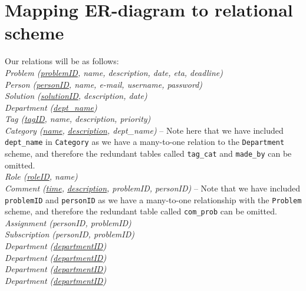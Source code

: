 \section{Mapping ER-diagram to relational scheme}
\label{sec:map_er_rel}

Our relations will be as follows:\\

\noindent \textit{Problem (\underline{problemID}, name, description, date, eta, deadline)} \\
\textit{Person (\underline{personID}, name, e-mail, username, password)} \\
\textit{Solution (\underline{solutionID}, description, date)} \\
\textit{Department (\underline{dept\_name})} \\
\textit{Tag (\underline{tagID}, name, description, priority)} \\
\textit{Category (\underline{name}, \underline{description}, dept\_name)} -- Note here that we have included \verb+dept_name+ in \verb+Category+ as we have a many-to-one relation to the \verb+Department+ scheme, and therefore the redundant tables called \verb+tag_cat+ and \verb+made_by+ can be omitted.\\
\textit{Role (\underline{roleID}, name)} \\
\textit{Comment (\underline{time}, \underline{description}, problemID, personID)} -- Note that we have included \verb+problemID+ and \verb+personID+ as we have a many-to-one relationship with the \verb+Problem+ scheme, and therefore the redundant table called \verb+com_prob+ can be omitted.\\
\textit{Assignment (personID, problemID)} \\
\textit{Subscription (personID, problemID)} \\
\textit{Department (\underline{departmentID})} \\
\textit{Department (\underline{departmentID})} \\
\textit{Department (\underline{departmentID})} \\
\textit{Department (\underline{departmentID})} \\



